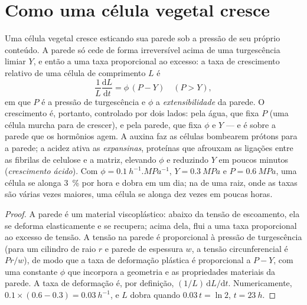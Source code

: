 \section{Como uma célula vegetal cresce}

\begin{theorem}\label{thm:b2:plant-meristems:lockhart}
Uma célula vegetal cresce esticando sua parede sob a pressão de seu
próprio conteúdo. A parede só cede de forma irreversível acima de uma
turgescência limiar $Y$, e então a uma taxa proporcional ao excesso: a
taxa de crescimento relativo de uma célula de comprimento $L$ é
\[
\frac{1}{L}\frac{\mathrm{d}L}{\mathrm{d}t} = \phi\,(P - Y) \quad (P > Y),
\]
em que $P$ é a pressão de turgescência e $\phi$ a
\emph{extensibilidade} da parede. O crescimento é, portanto,
controlado por dois lados: pela água, que fixa $P$ (uma célula murcha
para de crescer), e pela parede, que fixa $\phi$ e $Y$ --- e é sobre a
parede que os hormônios agem. A auxina faz as células bombearem
prótons para a parede; a acidez ativa as \emph{expansinas}, proteínas
que afrouxam as ligações entre as fibrilas de celulose e a matriz,
elevando $\phi$ e reduzindo $Y$ em poucos minutos (\emph{crescimento
ácido}). Com $\phi =
\qty{0.1}{h^{-1}.MPa^{-1}}$, $Y = \qty{0.3}{MPa}$ e $P =
\qty{0.6}{MPa}$, uma célula se alonga \qty{3}{\%} por hora e dobra em
um dia; na  de uma raiz, onde as taxas são várias
vezes maiores, uma célula se alonga dez vezes em poucas horas.
\end{theorem}
\begin{proof}
A parede é um material viscoplástico: abaixo da tensão de escoamento,
ela se deforma elasticamente e se recupera; acima dela, flui a uma taxa
proporcional ao excesso de tensão. A tensão na parede é proporcional à
pressão de turgescência (para um cilindro de raio $r$ e parede de
espessura $w$, a tensão circunferencial é $Pr/w$), de modo que a taxa
de deformação plástica é proporcional a $P - Y$, com uma constante
$\phi$ que incorpora a geometria e as propriedades materiais da parede.
A taxa de deformação é, por definição, $(1/L)\,\mathrm{d}L/\mathrm{d}t$.
Numericamente, $0.1\times(0.6 - 0.3) = \qty{0.03}{h^{-1}}$, e $L$ dobra
quando $0.03\,t = \ln 2$, $t = \qty{23}{h}$.
\end{proof}

